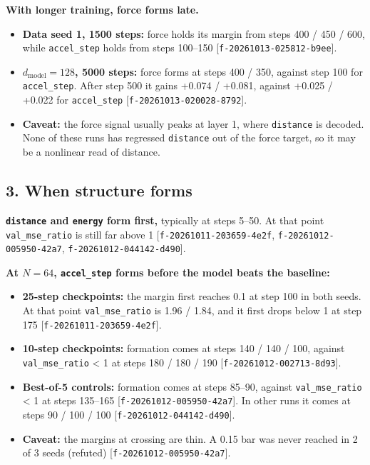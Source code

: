 \documentclass{article}
\begin{document}
\textbf{With longer training, force forms late.}

\begin{itemize}
\item \textbf{Data seed 1, 1500 steps:} force holds its margin from steps 400 / 450 / 600, while \texttt{accel\_step} holds from steps 100–150 [\texttt{f-20261013-025812-b9ee}].
\item \textbf{$d_{\text{model}} = 128$, 5000 steps:} force forms at steps 400 / 350, against step 100 for \texttt{accel\_step}. After step 500 it gains +0.074 / +0.081, against +0.025 / +0.022 for \texttt{accel\_step} [\texttt{f-20261013-020028-8792}].
\item \textbf{Caveat:} the force signal usually peaks at layer 1, where \texttt{distance} is decoded. None of these runs has regressed \texttt{distance} out of the force target, so it may be a nonlinear read of distance.
\end{itemize}

\subsection{3. When structure forms}

\textbf{\texttt{distance} and \texttt{energy} form first,} typically at steps 5–50. At that point \texttt{val\_mse\_ratio} is still far above 1 [\texttt{f-20261011-203659-4e2f}, \texttt{f-20261012-005950-42a7}, \texttt{f-20261012-044142-d490}].

\textbf{At $N = 64$, \texttt{accel\_step} forms before the model beats the baseline:}

\begin{itemize}
\item \textbf{25-step checkpoints:} the margin first reaches 0.1 at step 100 in both seeds. At that point \texttt{val\_mse\_ratio} is 1.96 / 1.84, and it first drops below 1 at step 175 [\texttt{f-20261011-203659-4e2f}].
\item \textbf{10-step checkpoints:} formation comes at steps 140 / 140 / 100, against \texttt{val\_mse\_ratio} < 1 at steps 180 / 180 / 190 [\texttt{f-20261012-002713-8d93}].
\item \textbf{Best-of-5 controls:} formation comes at steps 85–90, against \texttt{val\_mse\_ratio} < 1 at steps 135–165 [\texttt{f-20261012-005950-42a7}]. In other runs it comes at steps 90 / 100 / 100 [\texttt{f-20261012-044142-d490}].
\item \textbf{Caveat:} the margins at crossing are thin. A 0.15 bar was never reached in 2 of 3 seeds (refuted) [\texttt{f-20261012-005950-42a7}].
\end{itemize}
\end{document}
